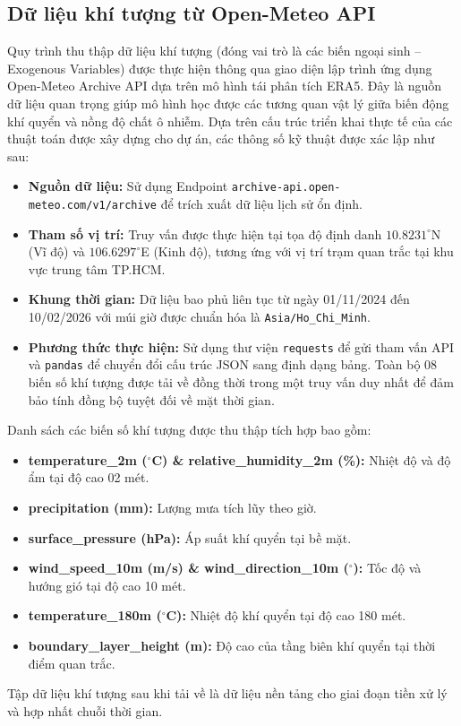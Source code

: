 \subsection{Dữ liệu khí tượng từ Open-Meteo API}
Quy trình thu thập dữ liệu khí tượng (đóng vai trò là các biến ngoại sinh -- Exogenous Variables) được thực hiện thông qua giao diện lập trình ứng dụng Open-Meteo Archive API dựa trên mô hình tái phân tích ERA5. Đây là nguồn dữ liệu quan trọng giúp mô hình học được các tương quan vật lý giữa biến động khí quyển và nồng độ chất ô nhiễm.
Dựa trên cấu trúc triển khai thực tế của các thuật toán được xây dựng cho dự án, các thông số kỹ thuật được xác lập như sau:
\begin{itemize}
    \item \textbf{Nguồn dữ liệu:} Sử dụng Endpoint \texttt{archive-api.open-meteo.com/v1/archive} để trích xuất dữ liệu lịch sử ổn định.
    \item \textbf{Tham số vị trí:} Truy vấn được thực hiện tại tọa độ định danh $10.8231^\circ$N (Vĩ độ) và $106.6297^\circ$E (Kinh độ), tương ứng với vị trí trạm quan trắc tại khu vực trung tâm TP.HCM.
    \item \textbf{Khung thời gian:} Dữ liệu bao phủ liên tục từ ngày 01/11/2024 đến 10/02/2026 với múi giờ được chuẩn hóa là \texttt{Asia/Ho\_Chi\_Minh}.
    \item \textbf{Phương thức thực hiện:} Sử dụng thư viện \texttt{requests} để gửi tham vấn API và \texttt{pandas} để chuyển đổi cấu trúc JSON sang định dạng bảng. Toàn bộ 08 biến số khí tượng được tải về đồng thời trong một truy vấn duy nhất để đảm bảo tính đồng bộ tuyệt đối về mặt thời gian.
\end{itemize}
Danh sách các biến số khí tượng được thu thập tích hợp bao gồm:
\begin{itemize}
    \item \textbf{temperature\_2m ($^\circ$C) \& relative\_humidity\_2m (\%):} Nhiệt độ và độ ẩm tại độ cao 02 mét.
    \item \textbf{precipitation (mm):} Lượng mưa tích lũy theo giờ.
    \item \textbf{surface\_pressure (hPa):} Áp suất khí quyển tại bề mặt.
    \item \textbf{wind\_speed\_10m (m/s) \& wind\_direction\_10m ($^\circ$):} Tốc độ và hướng gió tại độ cao 10 mét.
    \item \textbf{temperature\_180m ($^\circ$C):} Nhiệt độ khí quyển tại độ cao 180 mét.
    \item \textbf{boundary\_layer\_height (m):} Độ cao của tầng biên khí quyển tại thời điểm quan trắc.
\end{itemize}
Tập dữ liệu khí tượng sau khi tải về là dữ liệu nền tảng cho giai đoạn tiền xử lý và hợp nhất chuỗi thời gian.


